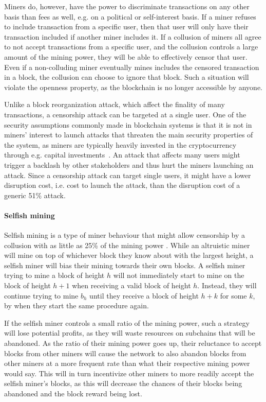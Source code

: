 Miners do, however, have the power to discriminate transactions on any other basis than fees as well, e.g. on a political or self-interest basis. If a miner refuses to include transaction from a specific user, then that user will only have their transaction included if another miner includes it. If a collusion of miners all agree to not accept transactions from a specific user, and the collusion controls a large amount of the mining power, they will be able to effectively censor that user. Even if a non-colluding miner eventually mines includes the censored transaction in a block, the collusion can choose to ignore that block. Such a situation will violate the openness property, as the blockchain is no longer accessible by anyone. 

Unlike a block reorganization attack, which affect the finality of many transactions, a censorship attack can be targeted at a single user. One of the security assumptions commonly made in blockchain systems is that it is not in miners' interest to launch attacks that threaten the main security properties of the system, as miners are typically heavily invested in the cryptocurrency through e.g. capital investments~\cite{buterin_problem_2015,wuille_security_2019}. An attack that affects many users might trigger a backlash by other stakeholders and thus hurt the miners launching an attack. Since a censorship attack can target single users, it might have a lower disruption cost, i.e. cost to launch the attack, than the disruption cost of a generic 51\% attack. 

\paragraph{Selfish mining}
Selfish mining is a type of miner behaviour that might allow censorship by a collusion with as little as 25\% of the mining power \cite{eyal_majority_2018}. While an altruistic miner will mine on top of whichever block they know about with the largest height, a selfish miner will bias their mining towards their own blocks. A selfish miner trying to mine a block of height $h$ will not immediately start to mine on the block of height $h+1$ when receiving a valid block of height $h$. Instead, they will continue trying to mine $b_h$ until they receive a block of height $h+k$ for some $k$, by when they start the same procedure again.

If the selfish miner controls a small ratio of the mining power, such a strategy will lose potential profits, as they will waste resources on subchains that will be abandoned. As the ratio of their mining power goes up, their reluctance to accept blocks from other miners will cause the network to also abandon blocks from other miners at a more frequent rate than what their respective mining power would say. This will in turn incentivize other miners to more readily accept the selfish miner's blocks, as this will decrease the chances of their blocks being abandoned and the block reward being lost.

